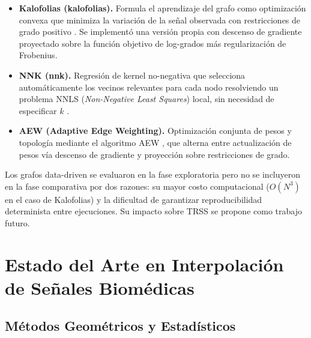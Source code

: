 \begin{itemize}[leftmargin=*,itemsep=1pt,topsep=2pt]
\item \textbf{Kalofolias (kalofolias).} Formula el aprendizaje del grafo como optimización convexa que minimiza la variación de la señal observada con restricciones de grado positivo \cite{kalofolias_how_2016}. Se implementó una versión propia con descenso de gradiente proyectado sobre la función objetivo de log-grados más regularización de Frobenius.
\item \textbf{NNK (nnk).} Regresión de kernel no-negativa que selecciona automáticamente los vecinos relevantes para cada nodo resolviendo un problema NNLS (\textit{Non-Negative Least Squares}) local, sin necesidad de especificar $k$ \cite{shekkizhar2020}.
\item \textbf{AEW (Adaptive Edge Weighting).} Optimización conjunta de pesos y topología mediante el algoritmo AEW \cite{shekkizhar2020}, que alterna entre actualización de pesos vía descenso de gradiente y proyección sobre restricciones de grado.
\end{itemize}
Los grafos data-driven se evaluaron en la fase exploratoria pero no se incluyeron en la fase comparativa por dos razones: su mayor costo computacional ($O(N^3)$ en el caso de Kalofolias) y la dificultad de garantizar reproducibilidad determinista entre ejecuciones. Su impacto sobre TRSS se propone como trabajo futuro.

\section{Estado del Arte en Interpolación de Señales Biomédicas}

\subsection{Métodos Geométricos y Estadísticos}

